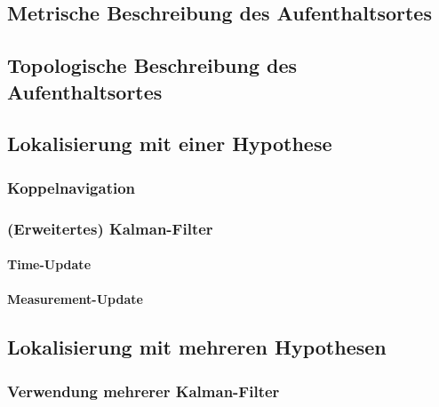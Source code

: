 \documentclass[a4paper, 11pt, accentcolor = tud3b]{tudreport}
\begin{document}
			\subsection{Metrische Beschreibung des Aufenthaltsortes} %

			\subsection{Topologische Beschreibung des Aufenthaltsortes} %

			\subsection{Lokalisierung mit einer Hypothese} %

				\subsubsection{Koppelnavigation} %

				\subsubsection{(Erweitertes) Kalman-Filter} %

					\paragraph{Time-Update} %

					\paragraph{Measurement-Update} %

			\subsection{Lokalisierung mit mehreren Hypothesen} %

				\subsubsection{Verwendung mehrerer Kalman-Filter} %
\end{document}
